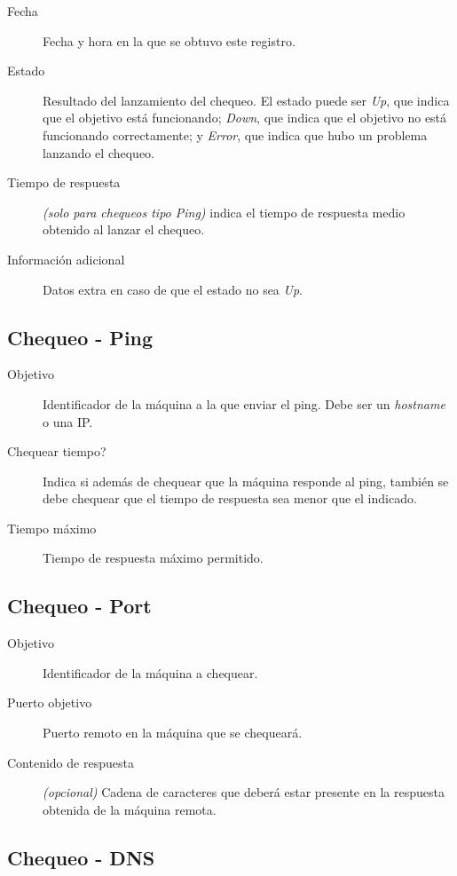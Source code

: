\begin{description}
\item[Fecha] Fecha y hora en la que se obtuvo este registro.
\item[Estado] Resultado del lanzamiento del chequeo. El estado puede ser
  \textit{Up}, que indica que el objetivo está funcionando; \textit{Down}, que
  indica que el objetivo no está funcionando correctamente; y \textit{Error},
  que indica que hubo un problema lanzando el chequeo.
\item[Tiempo de respuesta] \textit{(solo para chequeos tipo Ping)} indica el
  tiempo de respuesta medio obtenido al lanzar el chequeo.
\item[Información adicional] Datos extra en caso de que el estado no sea \textit{Up}.
\end{description}

\subsection{Chequeo - Ping}

\begin{description}
\item[Objetivo] Identificador de la máquina a la que enviar el ping. Debe ser un
  \textit{hostname} o una IP.
\item[Chequear tiempo?] Indica si además de chequear que la máquina responde al
  ping, también se debe chequear que el tiempo de respuesta sea menor que el indicado.
\item[Tiempo máximo] Tiempo de respuesta máximo permitido.
\end{description}

\subsection{Chequeo - Port}

\begin{description}
\item[Objetivo] Identificador de la máquina a chequear.
\item[Puerto objetivo] Puerto remoto en la máquina que se chequeará.
\item[Contenido de respuesta] \textit{(opcional)} Cadena de caracteres que
  deberá estar presente en la respuesta obtenida de la máquina remota.
\end{description}

\subsection{Chequeo - DNS}

